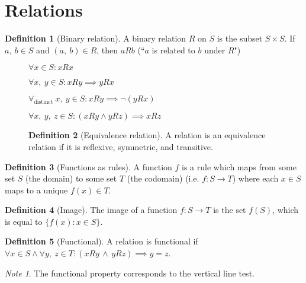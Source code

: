 \documentclass{article}
\theoremstyle{plain}
\numberwithin{theorem}{subsection}
\theoremstyle{definition}
\newtheorem{definition}{Definition}[section]
\numberwithin{definition}{subsection}
\theoremstyle{remark}
\newtheorem{note}{Note}[section]
\numberwithin{note}{subsection}
\begin{document}
\section{Relations}
\begin{definition}[Binary relation]
    A binary relation $R$ on $S$ is the subset $S\times S$.
    If $a, \: b \in S$ and  $(a, \: b) \in R$,
    then $aRb$ (``$a$ is related to $b$ under $R$")
\end{definition}
%
\begin{figure}[H]
    \begin{mdframed}[style=exampledefault,frametitle={Relation Properties}]
        \begin{description}[style=sameline]
            \item[Reflexive]
                $\forall x \in S : xRx$
            \item[Symmetric]
                $\forall x,\: y \in S : xRy \implies yRx$
            \item[Antisymmetric]
                $\forall_\text{distinct} \: x,\: y \in S : xRy \implies \neg (yRx)$
            \item[Transitive]
                $\forall x,\: y, \: z \in S : (xRy \land yRz) \implies xRz$
        \end{description}
        \begin{definition}[Equivalence relation]
            A relation is an equivalence relation if it is
            reflexive, symmetric, and transitive.
        \end{definition}
    \end{mdframed}
\end{figure}
%
\begin{definition}[Functions as rules]
    A function $f$ is a rule which maps
    from some set $S$ (the domain)
    to some set $T$ (the codomain)
    (i.e. $f: S \to T$) where each $x \in S$ maps to a unique $f(x) \in T$.
\end{definition}
\begin{definition}[Image]
    The image of a function $f: S \to T$ is the set $f(S)$,
    which is equal to $\{f(x):x \in S\}$.
\end{definition}
\begin{definition}[Functional]
    A relation is functional if
    $\forall x \in S \land \forall y,\: z \in T
        : (xRy \, \land \, yRz) \implies y=z$.
\end{definition}
\begin{note}
    The functional property corresponds to the vertical line test.
\end{note}
\end{document}
